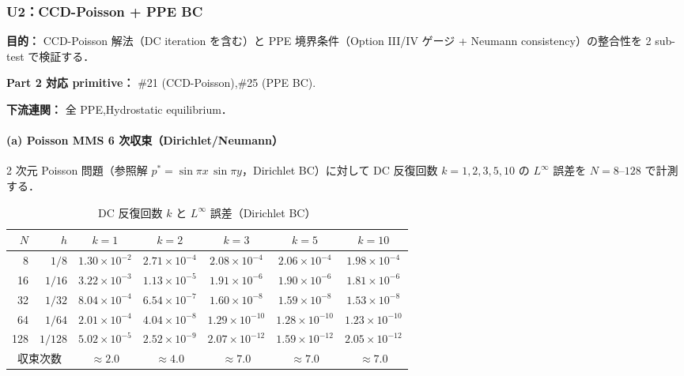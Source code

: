 \subsubsection{U2：CCD-Poisson + PPE BC}
\label{sec:U2_ccd_poisson_ppe_bc}

\noindent\textbf{目的：}
CCD-Poisson 解法（DC iteration を含む）と
PPE 境界条件（Option III/IV ゲージ + Neumann consistency）の整合性を
2 sub-test で検証する．

\noindent\textbf{Part 2 対応 primitive：}
\#21 (CCD-Poisson),\#25 (PPE BC).

\noindent\textbf{下流連関：}
全 PPE,Hydrostatic equilibrium．

\paragraph{(a) Poisson MMS 6 次収束（Dirichlet/Neumann）}
\label{sec:verify_ppe}
\label{sec:dc_iteration_accuracy}

2 次元 Poisson 問題（参照解 $p^* = \sin\pi x\,\sin\pi y$，Dirichlet BC）に対して
DC 反復回数 $k = 1, 2, 3, 5, 10$ の $L^\infty$ 誤差を $N = 8$--$128$ で計測する．

\begin{table}[htbp]
\centering
\caption{DC 反復回数 $k$ と $L^\infty$ 誤差（Dirichlet BC）}
\label{tab:dc_k_accuracy}
\renewcommand{\arraystretch}{1.2}
\footnotesize
\begin{tabular}{rr ccccc}
\toprule
$N$ & $h$ & $k=1$ & $k=2$ & $k=3$ & $k=5$ & $k=10$ \\
\midrule
  8 & $1/8$   & $1.30 \times 10^{-2}$ & $2.71 \times 10^{-4}$ & $2.08 \times 10^{-4}$ & $2.06 \times 10^{-4}$ & $1.98 \times 10^{-4}$ \\
 16 & $1/16$  & $3.22 \times 10^{-3}$ & $1.13 \times 10^{-5}$ & $1.91 \times 10^{-6}$ & $1.90 \times 10^{-6}$ & $1.81 \times 10^{-6}$ \\
 32 & $1/32$  & $8.04 \times 10^{-4}$ & $6.54 \times 10^{-7}$ & $1.60 \times 10^{-8}$ & $1.59 \times 10^{-8}$ & $1.53 \times 10^{-8}$ \\
 64 & $1/64$  & $2.01 \times 10^{-4}$ & $4.04 \times 10^{-8}$ & $1.29 \times 10^{-10}$ & $1.28 \times 10^{-10}$ & $1.23 \times 10^{-10}$ \\
128 & $1/128$ & $5.02 \times 10^{-5}$ & $2.52 \times 10^{-9}$ & $2.07 \times 10^{-12}$ & $1.59 \times 10^{-12}$ & $2.05 \times 10^{-12}$ \\
\midrule
\multicolumn{2}{c}{収束次数} & $\approx 2.0$ & $\approx 4.0$ & $\approx 7.0$ & $\approx 7.0$ & $\approx 7.0$ \\
\bottomrule
\end{tabular}
\end{table}

